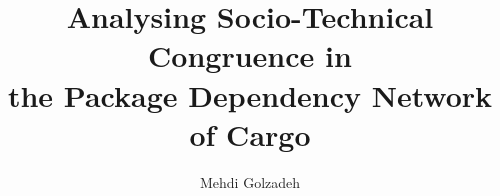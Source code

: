 



\renewcommand\footnotetextcopyrightpermission[1]{} %
\pagestyle{plain}

\usepackage{amssymb}%
\usepackage{pifont}%

\newcommand{\commentty}[1]{{\color{blue} \sf (TY: #1)}}
\newcommand{\commentlh}[1]{{\color{red} \sf (LH: #1)}}

\def\BibTeX{{\rm B\kern-.05em{\sc i\kern-.025em b}\kern-.08em
		T\kern-.1667em\lower.7ex\hbox{E}\kern-.125emX}}




	
\title{Analysing Socio-Technical Congruence in\\ the Package Dependency Network of Cargo}

	\author{Mehdi Golzadeh}
	
	\newcommand*{\Scale}[2][4]{\scalebox{#1}{$#2$}}%
	\newcommand{\Tool}{ComAir\xspace}
	\newcommand{\ComBugs}{30\xspace}
	
	
	
	
	
	
\maketitle
	






\newpage







